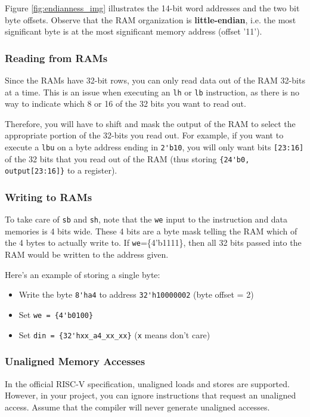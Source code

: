 Figure \ref{fig:endianness_img} illustrates the 14-bit word addresses and the two bit byte offsets.
Observe that the RAM organization is \textbf{little-endian}, i.e. the most significant byte is at the most significant memory address (offset '11').

\subsubsection{Reading from RAMs}
Since the RAMs have 32-bit rows, you can only read data out of the RAM 32-bits at a time.
This is an issue when executing an \verb|lh| or \verb|lb| instruction, as there is no way to indicate which 8 or 16 of the 32 bits you want to read out.

Therefore, you will have to shift and mask the output of the RAM to select the appropriate portion of the 32-bits you read out.
For example, if you want to execute a \verb|lbu| on a byte address ending in \verb|2'b10|, you will only want bits \verb|[23:16]| of the 32 bits that you read out of the RAM (thus storing \verb|{24'b0, output[23:16]}| to a register).

\subsubsection{Writing to RAMs}
To take care of \verb|sb| and \verb|sh|, note that the \verb|we| input to the instruction and data memories is 4 bits wide.
These 4 bits are a byte mask telling the RAM which of the 4 bytes to actually write to.
If \verb|we|=\{4'b1111\}, then all 32 bits passed into the RAM would be written to the address given.

Here's an example of storing a single byte:
\begin{itemize}
  \item Write the byte \verb|8'ha4| to address \verb|32'h10000002| (byte offset = 2)
  \item Set \verb|we = {4'b0100}|
  \item Set \verb|din = {32'hxx_a4_xx_xx}| (\verb|x| means don't care)
\end{itemize}

\subsubsection{Unaligned Memory Accesses}
In the official RISC-V specification, unaligned loads and stores are supported.
However, in your project, you can ignore instructions that request an unaligned access.
Assume that the compiler will never generate unaligned accesses.


